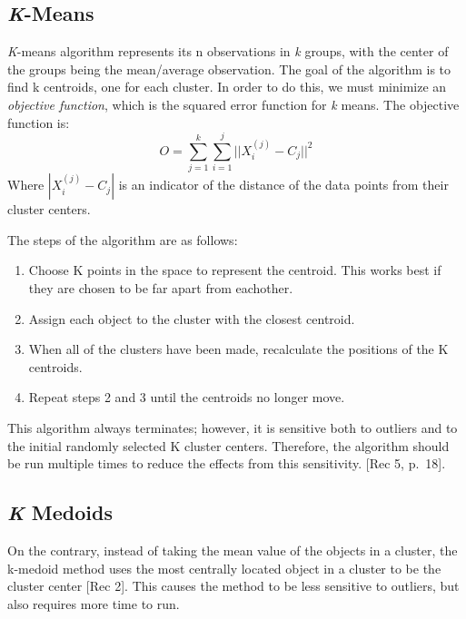 \documentclass[12pt,twoside]{amherstthesis}
\providecommand{\tightlist}{%
  \setlength{\itemsep}{0pt}\setlength{\parskip}{0pt}}
\begin{document}
  \subsection{\texorpdfstring{\emph{K}-Means}{K-Means}}\label{k-means}
  
  \emph{K}-means algorithm represents its n observations in \emph{k}
  groups, with the center of the groups being the mean/average
  observation. The goal of the algorithm is to find k centroids, one for
  each cluster. In order to do this, we must minimize an \emph{objective
  function}, which is the squared error function for \emph{k} means. The
  objective function is:
  \[O= \sum_{j=1}^k \sum_{i=1}^j ||{{X_i^{(j)}- C_j}}||^2
  \] Where \(|{{X_i^{(j)}- C_j}}|\) is an indicator of the distance of the
  data points from their cluster centers.
  
  The steps of the algorithm are as follows:
  
  \begin{enumerate}
  \def\labelenumi{\arabic{enumi}.}
  \tightlist
  \item
    Choose K points in the space to represent the centroid. This works
    best if they are chosen to be far apart from eachother.
  \item
    Assign each object to the cluster with the closest centroid.
  \item
    When all of the clusters have been made, recalculate the positions of
    the K centroids.
  \item
    Repeat steps 2 and 3 until the centroids no longer move.
  \end{enumerate}
  
  This algorithm always terminates; however, it is sensitive both to
  outliers and to the initial randomly selected K cluster centers.
  Therefore, the algorithm should be run multiple times to reduce the
  effects from this sensitivity. {[}Rec 5, p.~18{]}.
  
  \subsection{\texorpdfstring{\emph{K}
  Medoids}{K Medoids}}\label{k-medoids}
  
  On the contrary, instead of taking the mean value of the objects in a
  cluster, the k-medoid method uses the most centrally located object in a
  cluster to be the cluster center {[}Rec 2{]}. This causes the method to
  be less sensitive to outliers, but also requires more time to run.
  
\end{document}
